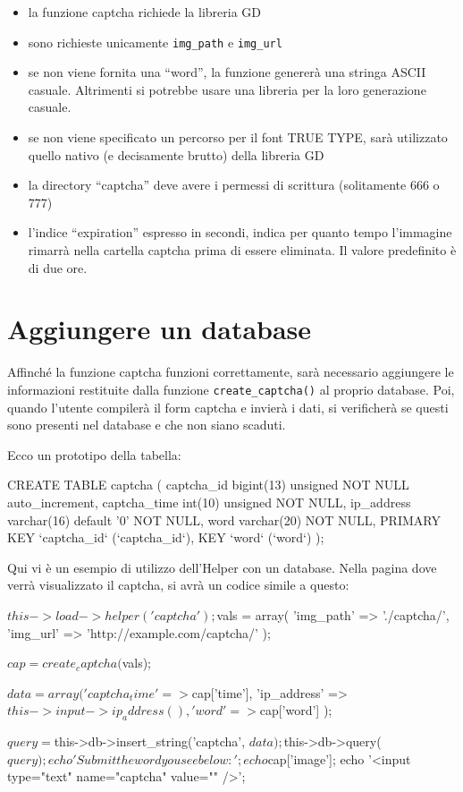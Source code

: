 \begin{itemize}
\item la funzione captcha richiede la libreria GD
\item sono richieste unicamente \verb|img_path| e \verb|img_url|
\item se non viene fornita una ``word'', la funzione genererà una stringa ASCII casuale. Altrimenti si potrebbe usare una libreria per la loro generazione casuale.
\item se non viene specificato un percorso per il font TRUE TYPE, sarà utilizzato quello nativo (e decisamente brutto) della libreria GD
\item la directory ``captcha'' deve avere i permessi di scrittura (solitamente 666 o 777)
\item l'indice ``expiration'' espresso in secondi, indica per quanto tempo l'immagine rimarrà nella cartella captcha prima di essere eliminata. Il valore predefinito è di due ore.
\end{itemize}

\section*{Aggiungere un database}

Affinché la funzione captcha funzioni correttamente, sarà necessario aggiungere le informazioni restituite dalla funzione \verb|create_captcha()| al proprio database. Poi, quando l'utente compilerà il form captcha e invierà i dati, si verificherà se questi sono presenti nel database e che non siano scaduti.

Ecco un prototipo della tabella:

\begin{code}
CREATE TABLE captcha (
 captcha_id bigint(13) unsigned NOT NULL auto_increment,
 captcha_time int(10) unsigned NOT NULL,
 ip_address varchar(16) default '0' NOT NULL,
 word varchar(20) NOT NULL,
 PRIMARY KEY `captcha_id` (`captcha_id`),
 KEY `word` (`word`)
);
\end{code}

Qui vi è un esempio di utilizzo dell'Helper con un database. Nella pagina dove verrà visualizzato il captcha, si avrà un codice simile a questo:

\begin{code}
$this->load->helper('captcha');
$vals = array(
    'img_path'	 => './captcha/',
    'img_url'	 => 'http://example.com/captcha/'
    );

$cap = create_captcha($vals);

$data = array(
    'captcha_time'	=> $cap['time'],
    'ip_address'	=> $this->input->ip_address(),
    'word'	 => $cap['word']
    );

$query = $this->db->insert_string('captcha', $data);
$this->db->query($query);

echo 'Submit the word you see below:';
echo $cap['image'];
echo '<input type="text" name="captcha" value="" />';
\end{code}

